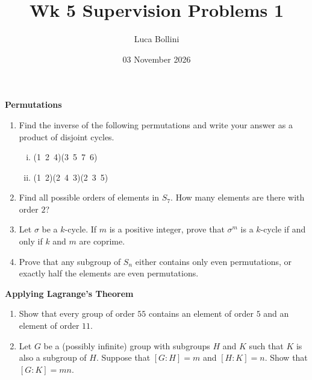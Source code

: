 \documentclass{article}
\title{Wk 5 Supervision Problems 1}
\author{Luca Bollini}
\date{03 November 2026}
\begin{document}
\maketitle

\begin{center}
\huge{\textbf{Permutations}}
\end{center}

\begin{enumerate}
    \item Find the inverse of the following permutations and write your answer as a product of disjoint cycles.
    \begin{enumerate}[(i)]
        \item (1~2~4)(3~5~7~6)
        \item (1~2)(2~4~3)(2~3~5)
    \end{enumerate}
    \item Find all possible orders of elements in $S_7$. How many elements are there with order $2$?
    \item Let $\sigma$ be a $k$-cycle. If $m$ is a positive integer, prove that $\sigma^m$ is a $k$-cycle if and only if $k$ and $m$ are coprime.
    \item Prove that any subgroup of $S_n$ either contains only even permutations, or exactly half the elements are even permutations.
\end{enumerate}

\begin{center}
\huge{\textbf{Applying Lagrange's Theorem}}
\end{center}

\begin{enumerate}
    \item Show that every group of order $55$ contains an element of order $5$ and an element of order $11$.
    \item Let $G$ be a (possibly infinite) group with subgroups $H$ and $K$ such that $K$ is also a subgroup of $H$. Suppose that $[G : H]=m$ and $[H : K]=n$. Show that $[G : K]=mn$.
\end{enumerate}
\end{document}
